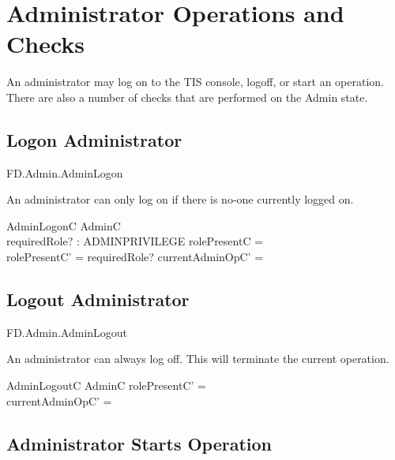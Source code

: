 \section{Administrator Operations and Checks}
An administrator may log on to the TIS console, logoff, or start an
operation. There are also a number of checks that are performed on the
Admin state.

\subsection{Logon Administrator}

\begin{traceunit}{FD.Admin.AdminLogon}
\end{traceunit}

An administrator can only log on if there is no-one currently logged on.

\begin{schema}{AdminLogonC}
        \Delta AdminC
\\      requiredRole? : ADMINPRIVILEGE
\where
        rolePresentC = \Nil
\also
\\      \The rolePresentC' = requiredRole?
\also
        currentAdminOpC' = \Nil
\end{schema}

\subsection{Logout Administrator}

\begin{traceunit}{FD.Admin.AdminLogout}
\end{traceunit}

An administrator can always log off.
This will terminate the current operation.

\begin{schema}{AdminLogoutC}
        \Delta AdminC
\where
        rolePresentC' = \Nil
\\      currentAdminOpC' = \Nil
\end{schema}

\subsection{Administrator Starts Operation}

